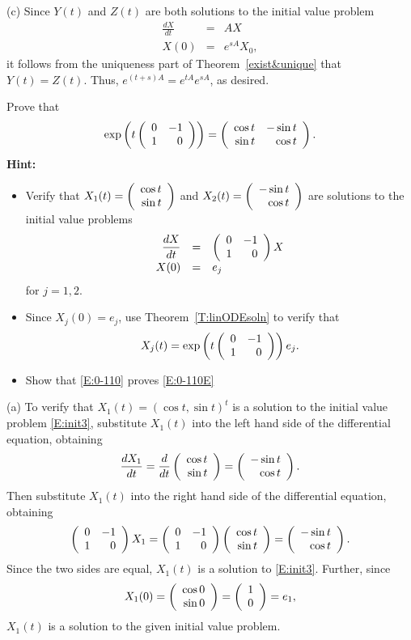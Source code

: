 \documentclass{ximera}
\begin{document}
\begin{exercise}
\begin{computerExercise}
\begin{solution}
(c) Since $Y(t)$ and $Z(t)$ are both solutions to the initial value problem
\[
\begin{array}{rcl}
\frac{dX}{dt} & = & AX \\
X(0) & = & e^{sA}X_0,
\end{array}
\]
it follows from the uniqueness part of Theorem~\ref{exist&unique} that
$Y(t) = Z(t)$.  Thus, $e^{(t + s)A} = e^{tA}e^{sA}$, as desired.


\end{solution}
\end{computerExercise}
\begin{computerExercise}  \label{c6.2.5C}
Prove that
\begin{equation}  \label{E:0-110E}
\exp\left(t\left(\begin{array}{rr} 0 & -1\\ 1 &0\end{array}\right)\right) =
\left(\begin{array}{rr} \cos t & -\sin t\\ \sin t &\cos t\end{array}\right).
\end{equation}
{\bf Hint:}
\begin{itemize}
\item[(a)] Verify that $X_1(t) = \left(\begin{array}{r} \cos t \\ \sin t\end{array}\right)$ and
$X_2(t) = \left(\begin{array}{r} -\sin t \\ \cos t\end{array}\right)$ are solutions to the initial value problems
\begin{equation}  \label{E:init3}
\begin{array}{rcl}
\displaystyle\frac{dX}{dt} & = & \left(\begin{array}{rr} 0 & -1\\ 1 &0\end{array}\right)X \\
X(0) & = & e_j
\end{array}
\end{equation}
for $j=1,2$.
\item[(b)] Since $X_j(0)=e_j$, use Theorem~\ref{T:linODEsoln} to verify that
\begin{equation}   \label{E:0-110}
X_j(t) = \exp\left(t\left(\begin{array}{rr} 0 & -1\\ 1 &0\end{array}\right)\right)e_j.
\end{equation}
\item[(c)]  Show that \eqref{E:0-110} proves \eqref{E:0-110E}
\end{itemize}

\begin{solution}

(a) To verify that $X_1(t) = (\cos t,\sin t)^t$ is a solution to the
initial value problem \eqref{E:init3}, substitute $X_1(t)$ into the left
hand side of the differential equation, obtaining
\[
\frac{dX_1}{dt} = \frac{d}{dt}\left(\begin{array}{r} \cos t \\ \sin t\end{array}\right) =
\left(\begin{array}{r} -\sin t \\ \cos t\end{array}\right).
\]
Then substitute $X_1(t)$ into the right hand side of the differential
equation, obtaining
\[
\left(\begin{array}{rr} 0 & -1\\ 1 &0\end{array}\right)X_1 = \left(\begin{array}{rr} 0 & -1\\ 1 &0\end{array}\right)\left(\begin{array}{r} \cos t \\ \sin t\end{array}\right)
= \left(\begin{array}{r} -\sin t \\ \cos t\end{array}\right).
\]
Since the two sides are equal, $X_1(t)$ is a solution to
\eqref{E:init3}.  Further, since
\[
X_1(0) = \left(\begin{array}{r} \cos 0 \\ \sin 0\end{array}\right) = \left(\begin{array}{r} 1 \\ 0\end{array}\right) = e_1,
\]
$X_1(t)$ is a solution to the given initial value problem.


\end{solution}
\end{computerExercise}
\end{exercise}
\end{document}
